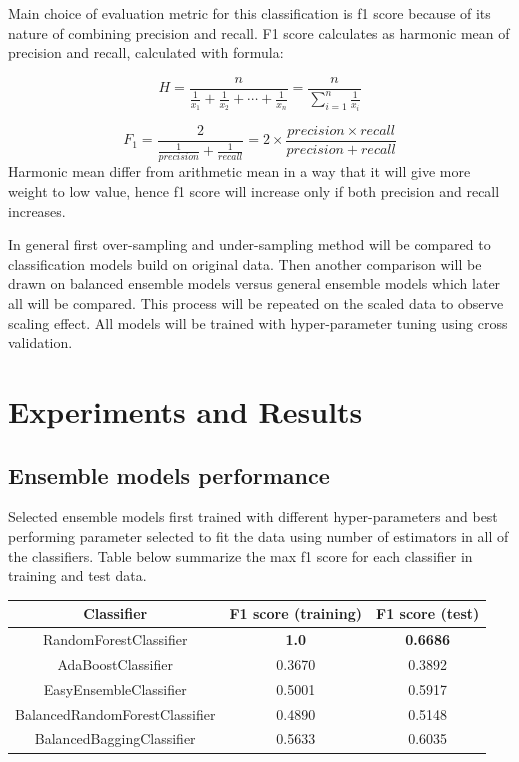 \documentclass[12pt]{article}
\begin{document}
Main choice of evaluation metric for this classification is f1 score because of its nature of combining precision and recall. F1 score calculates as harmonic mean of precision and recall, calculated with formula:

\begin{equation*}
    H = \frac{n}{\frac{1}{x_{1}} + \frac{1}{x_{2}} + \cdots + \frac{1}{x_{n}}} = \frac{n}{\sum_{i=1}^n{\frac{1}{x_{i}}}}
\end{equation*}

\begin{equation*}
    F_{1} = \frac{2}{\frac{1}{precision} + \frac{1}{recall}} = 2 \times \frac{precision \times recall}{precision + recall}
\end{equation*}
Harmonic mean differ from arithmetic mean in a way that it will give more weight to low value, hence f1 score will increase only if both precision and recall increases.

In general first over-sampling and under-sampling method will be compared to classification models build on original data. Then another comparison will be drawn on balanced ensemble models versus general ensemble models which later all will be compared. This process will be repeated on the scaled data to observe scaling effect. All models will be trained with hyper-parameter tuning using cross validation.

\section{Experiments and Results} \label{sec:experiment}
\subsection{Ensemble models performance} \label{subse:ensemblemodelperformance}
Selected ensemble models first trained with different hyper-parameters and best performing parameter selected to fit the data using number of estimators in all of the classifiers. Table below summarize the max f1 score for each classifier in training and test data. 

\begin{center}
    \begin{tabular}{||c c c||} 
    \hline
    Classifier & F1 score (training) & F1 score (test)\\ [0.5ex] 
    \hline\hline
    RandomForestClassifier & \textbf{1.0} & \textbf{0.6686} \\ 
    \hline
    AdaBoostClassifier & 0.3670 & 0.3892 \\
    \hline
    EasyEnsembleClassifier & 0.5001 & 0.5917 \\
    \hline
    BalancedRandomForestClassifier & 0.4890 & 0.5148 \\
    \hline
    BalancedBaggingClassifier & 0.5633 & 0.6035\\ [1ex] 
    \hline
   \end{tabular}
\end{center}
\end{document}
